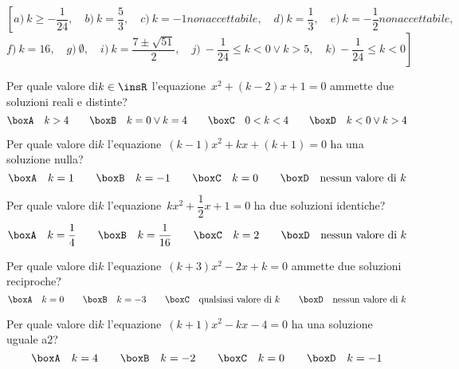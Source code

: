 \begin{flushright}
$\left[a)~ k \geq-\dfrac{1}{24} ,\quad b)~ k = \dfrac{5}{3} ,\quad 
c)~ k=-1  non accettabile,\quad d)~ k = \dfrac{1}{3} ,\quad e)~ k 
=-\dfrac{1}{2} non accettabile,\quad \right.$
$\left.f)~ k = 16 ,\quad g)~ \emptyset ,\quad 
i)~ k = \dfrac{7 \pm \sqrt{51}}{2} ,\quad j)~ - \dfrac{1}{24} \leq k < 0 
\vee k 
> 5 ,\quad k)~ - \dfrac{1}{24} \leq k < 0 \right]$
\end{flushright}

\begin{esercizio}
 \label{ese:3.106}
Per quale valore di$k \in \insR$ l'equazione~$x^{2} + (k-2) x + 1 = 0$ 
ammette 
due soluzioni reali e distinte?
\[\boxA\quad k > 4\qquad\boxB\quad k = 0 \vee k = 4\qquad\boxC\quad 0 < k < 
4\qquad\boxD\quad k < 0 \vee k > 4\]
\end{esercizio}

\begin{esercizio}
 \label{ese:3.107}
Per quale valore di$k$ l'equazione~$(k-1) x^{2} + kx + (k + 1) = 0$ ha una 
soluzione nulla?
\[\boxA\quad k = 1\qquad\boxB\quad k = -1\qquad\boxC\quad k 
=0\qquad\boxD\quad 
\text{nessun valore di }k\]
\end{esercizio}

\begin{esercizio}
 \label{ese:3.108}
Per quale valore di$k$ l'equazione~$kx^{2} + \dfrac{1}{2} x + 1 = 0$ ha due 
soluzioni identiche?
\[\boxA\quad k = \dfrac{1}{4}\qquad\boxB\quad k = 
\dfrac{1}{16}\qquad\boxC\quad k 
= 2\qquad\boxD\quad \text{nessun valore di }k\]
\end{esercizio}

\begin{esercizio}
 \label{ese:3.109}
Per quale valore di$k$ l'equazione~$(k + 3) x^{2}-2x + k = 0$ ammette due 
soluzioni reciproche?
\[\boxA\quad k = 0\qquad\boxB\quad k = -3\qquad\boxC\quad \text{qualsiasi 
valore 
di }k\qquad\boxD\quad \text{nessun valore di }k\]
\end{esercizio}

\begin{esercizio}
 \label{ese:3.110}
Per quale valore di$k$ l'equazione~$(k + 1) x^{2}-kx-4 = 0$ ha una 
soluzione 
uguale a$2$?
\[\boxA\quad k = 4\qquad\boxB\quad k =-2\qquad\boxC\quad k = 
0\qquad\boxD\quad k 
=-1\]
\end{esercizio}

